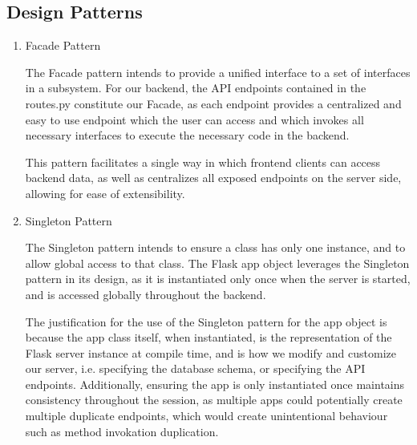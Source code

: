 \documentclass{article}
\begin{document}
\subsection{Design Patterns}
\begin{enumerate}
    \item Facade Pattern
    
    The Facade pattern intends to provide a unified interface to a set of interfaces in a subsystem. 
    For our backend, the API endpoints contained in the routes.py constitute our Facade,
    as each endpoint provides a centralized and easy to use endpoint which the user can access
    and which invokes all necessary interfaces to execute the necessary code in the backend.

    This pattern facilitates a single way in which frontend clients can access backend data,
    as well as centralizes all exposed endpoints on the server side, allowing for ease of
    extensibility.

    \item Singleton Pattern 
    
    The Singleton pattern intends to ensure a class has only one instance, and to allow global 
    access to that class. The Flask app object leverages the Singleton pattern in its design, as 
    it is instantiated only once when the server is started, and is accessed globally throughout the 
    backend. 

    The justification for the use of the Singleton pattern for the app object is because the app 
    class itself, when instantiated, is the representation of the Flask server instance at compile time,
    and is how we modify and customize our server, i.e. specifying the database schema, or specifying the API 
    endpoints. Additionally, ensuring the app is only instantiated once maintains consistency throughout the session,
    as multiple apps could potentially create multiple duplicate endpoints, which would create unintentional behaviour
    such as method invokation duplication.
\end{enumerate}
\clearpage
\end{document}
